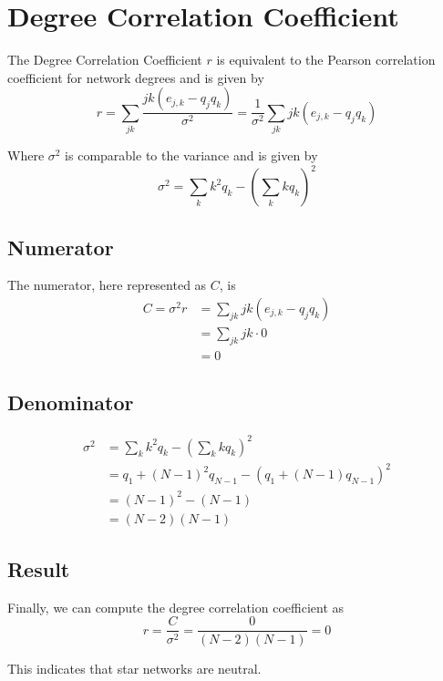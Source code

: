 \section{Degree Correlation Coefficient}

The Degree Correlation Coefficient $r$ is equivalent to the Pearson correlation coefficient for network degrees and is given by
\[
    r = \sum_{j k} \frac{j k \left(e_{j,k} - q_j q_k\right)}{\sigma^2} = \frac{1}{\sigma^2} \sum_{j k} j k \left(e_{j,k} - q_j q_k\right)
    \tag{7.11} \label{eq:coefficient}
\]

Where $\sigma^2$ is comparable to the variance and is given by
\[
    \sigma^2 = \sum_{k} k^2 q_k - \left(\sum_{k} k q_k\right)^2
    \tag{7.12} \label{eq:variance}
\]

\subsection{Numerator}

    The numerator, here represented as $C$, is
    \begin{align*}
        C = \sigma^2 r
            &= \sum_{j k} j k \left(e_{j,k} - q_j q_k\right) \\
            &= \sum_{j k} j k \cdot 0 \\
            &= 0
    \end{align*}

\subsection{Denominator}

    \begin{align*}
        \sigma^2 &= \sum_{k} k^2 q_k - \left(\sum_{k} k q_k\right)^2 \\
        &= q_1 + (N-1)^2 q_{N-1} - \left(q_1 + (N-1) q_{N-1}\right)^2 \\
        &= (N-1)^2 - (N-1) \\
        &= (N-2) (N-1)
    \end{align*}

\subsection{Result}

    Finally, we can compute the degree correlation coefficient as
    \[
        r = \frac{C}{\sigma^2} = \frac{0}{(N-2)(N-1)} = 0
    \]

    This indicates that star networks are neutral.
